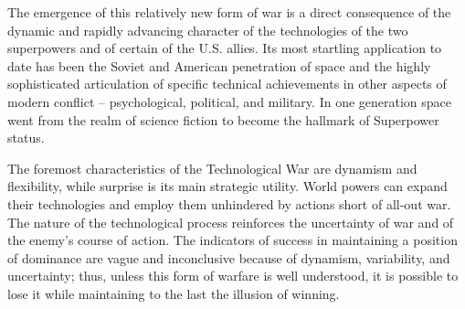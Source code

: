 \documentclass[a4paper,12pt]{book}
\begin{document}
The emergence of this relatively new form of war is a direct consequence of the dynamic and rapidly advancing character of the technologies of the two superpowers and of certain of the U.S. allies. Its most startling application to date has been the Soviet and American penetration of space and the highly sophisticated articulation of specific technical achievements in other aspects of modern conflict -- psychological, political, and military. In one generation space went from the realm of science fiction to become the hallmark of Superpower status.

The foremost characteristics of the Technological War are dynamism and flexibility, while surprise is its main strategic utility. World powers can expand their technologies and employ them unhindered by actions short of all-out war. The nature of the technological process reinforces the uncertainty of war and of the enemy's course of action. The indicators of success in maintaining a position of dominance are vague and inconclusive because of dynamism, variability, and uncertainty; thus, unless this form of warfare is well understood, it is possible to lose it while maintaining to the last the illusion of winning.
\end{document}
